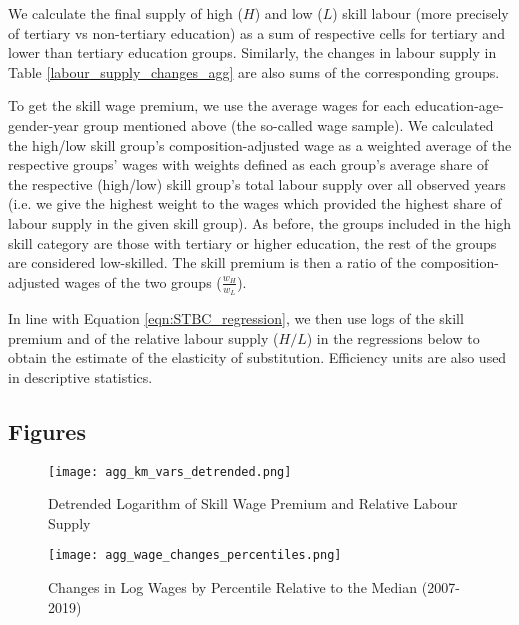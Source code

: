 \documentclass[11pt]{article}
\begin{document}
We calculate the final supply of high ($H$) and low ($L$) skill labour (more precisely of tertiary vs non-tertiary education) as a sum of respective cells for tertiary and lower than tertiary education groups. Similarly, the changes in labour supply in Table \ref{labour_supply_changes_agg} are also sums of the corresponding groups.

To get the skill wage premium, we use the average wages for each education-age-gender-year group mentioned above (the so-called wage sample). We calculated the high/low skill group's composition-adjusted wage as a weighted average of the respective groups' wages with weights defined as each group's average share of the respective (high/low) skill group's total labour supply over all observed years (i.e. we give the highest weight to the wages which provided the highest share of labour supply in the given skill group). As before, the groups included in the high skill category are those with tertiary or higher education, the rest of the groups are considered low-skilled. The skill premium is then a ratio of the composition-adjusted wages of the two groups ($\frac{w_H}{w_L}$).


In line with Equation \ref{eqn:STBC_regression}, we then use logs of the skill premium and of the relative labour supply ($H/L$) in the regressions below to obtain the estimate of the elasticity of substitution. Efficiency units are also used in descriptive statistics.



\subsection{Figures}

\begin{figure}[!htbp]%
    \centering
    \caption{Detrended Logarithm of Skill Wage Premium and Relative Labour Supply}
    {\texttt{[image: agg\_km\_vars\_detrended.png]} }
    \label{agg_km_vars_detrended}
\end{figure}




\begin{figure}[!htbp]%
    \centering
    \caption{Changes in Log Wages by Percentile Relative to the Median (2007-2019)}
    {\texttt{[image: agg\_wage\_changes\_percentiles.png]} }
    \label{agg_wage_changes_percentiles}
\end{figure}
\end{document}
